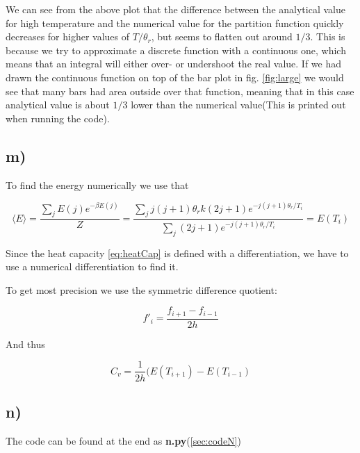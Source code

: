 \documentclass[a4paper,norsk, 10pt]{article}
\begin{document}
We can see from the above plot that the difference between the analytical value for high temperature and the numerical value for the partition function quickly decreases for higher values of $T/\theta_r$, but seems to flatten out around $1/3$. This is because we try to approximate a discrete function with a continuous one, which means that an integral will either over- or undershoot the real value. If we had drawn the continuous function on top of the bar plot in fig. \ref{fig:large} we would see that many bars had area outside over that function, meaning that in this case analytical value is about $1/3$ lower than the numerical value(This is printed out when running the code).


\subsection{m)}

To find the energy numerically we use that

\begin{equation}
\langle E\rangle = \frac{\sum_j E(j)e^{-\beta E(j)}}{Z} = \frac{\sum_j j(j+1)\theta_rk (2j + 1) e^{-j(j+1)\theta_r/T_i}}{\sum_j (2j + 1) e^{-j(j+1)\theta_r/T_i}} = E(T_i)
\end{equation}

Since the heat capacity \eqref{eq:heatCap} is defined with a differentiation, we have to use a numerical differentiation to find it.

To get most precision we use the symmetric difference quotient:

\begin{equation}
f'_i = \frac{f_{i+1} - f_{i-1}}{2h}
\end{equation}

And thus

\begin{equation}
C_v = \frac{1}{2h}(E(T_{i+1} )- E(T_{i-1})
\end{equation}	

\subsection{n)}
The code can be found at the end as \textbf{n.py}(\ref{sec:codeN})
\end{document}
